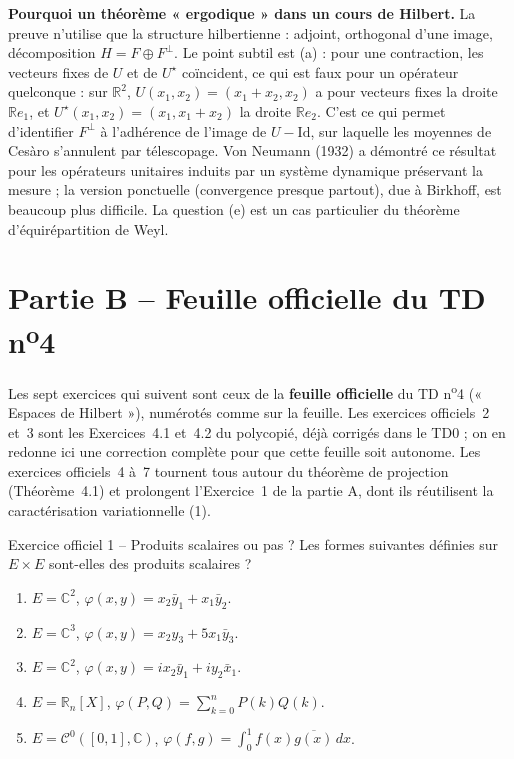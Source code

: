 \documentclass[11pt,a4paper]{article}
\newcommand{\R}{\mathbb{R}}
\newcommand{\C}{\mathbb{C}}
\newcommand{\Cz}{\mathcal{C}^0}
\theoremstyle{definition}
\begin{document}
\begin{commentaire}
\textbf{Pourquoi un théorème « ergodique » dans un cours de Hilbert.} La preuve n'utilise que la structure hilbertienne : adjoint, orthogonal d'une image, décomposition $H=F\oplus F^\perp$. Le point subtil est (a) : pour une contraction, les vecteurs fixes de $U$ et de $U^\star$ coïncident, ce qui est faux pour un opérateur quelconque : sur $\R^2$, $U(x_1,x_2)=(x_1+x_2,x_2)$ a pour vecteurs fixes la droite $\R e_1$, et $U^\star(x_1,x_2)=(x_1,x_1+x_2)$ la droite $\R e_2$. C'est ce qui permet d'identifier $F^\perp$ à l'adhérence de l'image de $U-\mathrm{Id}$, sur laquelle les moyennes de Cesàro s'annulent par télescopage. Von Neumann (1932) a démontré ce résultat pour les opérateurs unitaires induits par un système dynamique préservant la mesure ; la version ponctuelle (convergence presque partout), due à Birkhoff, est beaucoup plus difficile. La question (e) est un cas particulier du théorème d'équirépartition de Weyl.
\end{commentaire}


\section*{Partie B -- Feuille officielle du TD n\textsuperscript{o}4}

\begin{commentaire}
Les sept exercices qui suivent sont ceux de la \textbf{feuille officielle} du TD n\textsuperscript{o}4 (« Espaces de Hilbert »), numérotés comme sur la feuille. Les exercices officiels~2 et~3 sont les Exercices~4.1 et~4.2 du polycopié, déjà corrigés dans le TD0 ; on en redonne ici une correction complète pour que cette feuille soit autonome. Les exercices officiels~4 à~7 tournent tous autour du théorème de projection (Théorème~4.1) et prolongent l'Exercice~1 de la partie A, dont ils réutilisent la caractérisation variationnelle (1).
\end{commentaire}

\begin{exo}{Exercice officiel 1 -- Produits scalaires ou pas ?}
Les formes suivantes définies sur $E\times E$ sont-elles des produits scalaires ?
\begin{enumerate}[label=(\alph*)]
  \item $E=\C^2$, $\varphi(x,y)=x_2\bar y_1+x_1\bar y_2$.
  \item $E=\C^3$, $\varphi(x,y)=x_2y_3+5x_1\bar y_3$.
  \item $E=\C^2$, $\varphi(x,y)=ix_2\bar y_1+iy_2\bar x_1$.
  \item $E=\R_n[X]$, $\varphi(P,Q)=\sum_{k=0}^nP(k)Q(k)$.
  \item $E=\Cz([0,1],\C)$, $\varphi(f,g)=\int_0^1f(x)\overline{g(x)}\,dx$.
\end{enumerate}
\end{exo}
\end{document}

